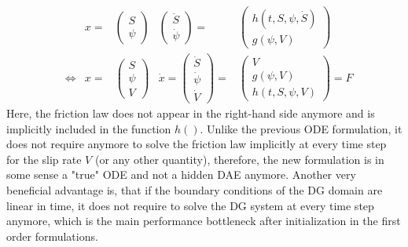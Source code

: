 \begin{align}
&&	 x      =& \begin{pmatrix}	S                     \\ \psi           \end{pmatrix}      &
	 		   \begin{pmatrix}	\ddot{S}              \\ \dot{\psi}     \end{pmatrix}
			=& \begin{pmatrix}	h(t,S,\psi,\dot{S})   \\ g(\psi, V)     \end{pmatrix}
			 	 		 \\ &\Leftrightarrow&	 		  		 
	 x      =& \begin{pmatrix}	S       \\ \psi       \\ V	            \end{pmatrix}      &
   	\dot{x}  = \begin{pmatrix}	\dot{S} \\ \dot{\psi} \\ \dot{V}        \end{pmatrix}
	 		=& \begin{pmatrix}	 V      \\ g(\psi, V) \\ h(t,S,\psi,V)  \end{pmatrix}
	 		 = F	
	\label{eq:2nd_order_ODE_formulation}
\end{align}
Here, the friction law does not appear in the right-hand side anymore and is implicitly included in the function $h()$. Unlike the previous ODE formulation, it does not require anymore to solve the friction law implicitly at every time step for the slip rate $V$ (or any other quantity), therefore, the new formulation is in some sense a "true" ODE and not a hidden DAE anymore. Another very beneficial advantage is, that if the boundary conditions of the DG domain are linear in time, it does not require to solve the DG system at every time step anymore, which is the main performance bottleneck after initialization in the first order formulations. 

